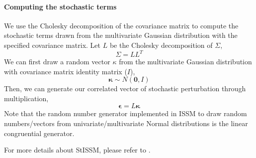\paragraph{Computing the stochastic terms}
We use the Cholesky decomposition of the covariance matrix to compute the stochastic terms drawn from the multivariate Gaussian distribution with the specified covariance matrix. Let $L$ be the Cholesky decomposition of $\Sigma$,
\begin{equation} \label{eq5}
	\Sigma = LL^{T}
\end{equation}
We can first draw a random vector $\kappa$ from the multivariate Gaussian distribution with covariance matrix identity matrix ($I$),
\begin{equation} \label{eq6}
	\boldsymbol{\kappa} \sim N\left(\boldsymbol{0},I\right)
\end{equation}
Then, we can generate our correlated vector of stochastic perturbation through multiplication,
\begin{equation} \label{eq6}
	\boldsymbol{\epsilon} = L\boldsymbol{\kappa}
\end{equation}
Note that the random number generator implemented in ISSM to draw random numbers/vectors from univariate/multivariate Normal distributions is the linear congruential generator.

For more details about StISSM, please refer to \cite{Verjans2022}.

\clearpage %
